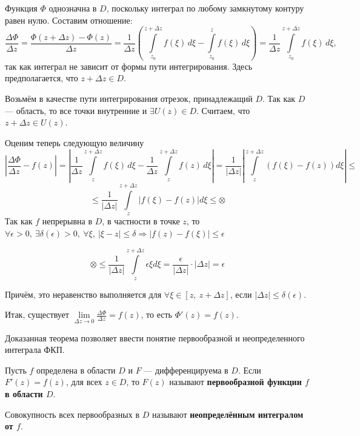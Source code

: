 \documentclass[a4paper, 12pt]{report}
\begin{document}
\blacklozenge \quad 
Функция $\Phi$ однозначна в $D$, поскольку интеграл по любому замкнутому контуру равен нулю. Составим отношение:
\[\frac{\Delta \Phi}{\Delta z} = \frac{\Phi(z + \Delta z)-\Phi(z)}{\Delta z} = \frac{1}{\Delta z} \left( \int\limits_{z_0}^{z+\Delta z}f(\xi)\,d\xi - \int\limits_{z_0}^z f(\xi)\,d\xi \right) = \frac{1}{\Delta z} \int\limits_{z_0}^{z+\Delta z}f(\xi)\,d\xi,\]
так как интеграл не зависит от формы пути интегрирования. Здесь предполагается, что $z+\Delta z \in D.$

Возьмём в качестве пути интегрирования отрезок, принадлежащий $D$. Так как $D$ --- область, то все точки внутренние и $\exists U(z) \in D$. Считаем, что $z+\Delta z \in U(z)$.

\par\bigskip Оценим теперь следующую величину
\[\left | \frac{\Delta \Phi}{\Delta z} - f(z) \right | = 
\left | \frac{1}{\Delta z}\int\limits_z^{z+\Delta z}f(\xi)\,d\xi - \frac{1}{\Delta z}\int\limits_z^{z+\Delta z}f(z)\,d\xi \right | = 
\frac{1}{|\Delta z|}\left | \int\limits_z^{z+\Delta z}(f(\xi) - f(z))d\xi \right | \leqslant\]
\[\leqslant \frac{1}{|\Delta z|}\int\limits_z^{z+\Delta z}|f(\xi) - f(z)| d\xi \leqslant 
\otimes\]
Так как $f$ непрерывна в $D$, в частности в точке $z$, то $\forall \epsilon > 0,\ 
\exists \delta (\epsilon)>0,\ 
\forall \xi,\ 
|\xi - z| \leqslant \delta \Rightarrow
|f(z) - f(\xi)| \leqslant \epsilon$

$$\otimes \leqslant 
\frac{1}{|\Delta z|} \int\limits_z^{z+ \Delta z} \epsilon \xi d\xi =
\frac{\epsilon}{|\Delta z|} \cdot |\Delta z| = 
\epsilon$$

Причём, это неравенство выполняется для 
$\forall \xi \in [z,\ z+\Delta z]$, если 
$|\Delta z| \leqslant \delta (\epsilon)$.

Итак, существует 
$\lim\limits_{\Delta z \to 0}\frac{\Delta \Phi}{\Delta z} = f(z)$, то есть 
$\Phi '(z) = f(z)$.
\blacksquare

Доказанная теорема позволяет ввести понятие первообразной и неопределенного интеграла ФКП.
\par\bigskip

Пусть $f$ определена в области $D$ и $F$ --- дифференцируема в $D$. Если $F'(z) = f(z)$, для всех $z \in D$, то $F(z)$ называют \textbf{первообразной функции $f$ в области $D$}.
\par\bigskip
Совокупность всех первообразных в $D$ называют \textbf{неопределённым интегралом от $f$}.
\par\bigskip
\end{document}

